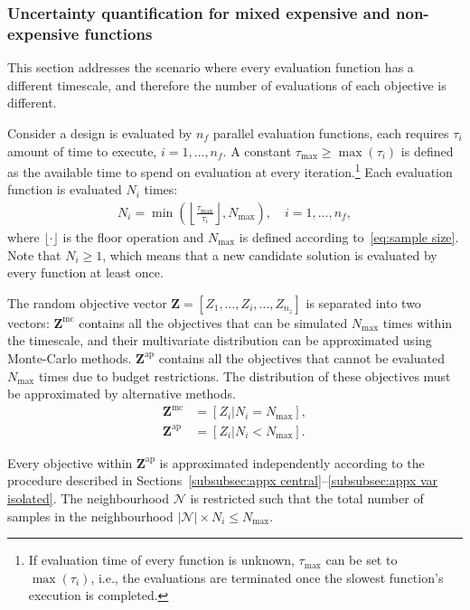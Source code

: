 \documentclass[a4paper]{article}
\newcommand{\brs}[1]{\left[{#1}\right]} %
\newcommand{\brr}[1]{{\left({#1}\right)}} %
\newcommand{\brabs}[1]{\left\vert{#1}\right\vert} %
\newcommand{\vZ}{\ensuremath{\mathbf{Z}}} %
\newcommand{\NSet}{\ensuremath{\mathcal{N}}} %
\begin{document}
\subsubsection{Uncertainty quantification for mixed expensive and non-expensive functions}
\label{subsubsec:mixed complexity functions}
This section addresses the scenario where every evaluation function has a different timescale, and therefore the number of evaluations of each objective is different.

Consider a design is evaluated by $n_f$ parallel evaluation functions, each requires $\tau_i$ amount of time to execute, $i=1,\ldots,n_f$. A constant $\tau_\text{max}\geq \max\brr{\tau_i}$ is defined as the available time to spend on evaluation at every iteration.\footnote{If evaluation time of every function is unknown, $\tau_\text{max}$ can be set to $\max\brr{\tau_i}$, i.e., the evaluations are terminated once the slowest function's execution is completed.} Each evaluation function is evaluated $N_i$ times:
\begin{align}
N_i = \min \brr{ \left\lfloor \frac{\tau_\text{max}}{\tau_i} \right\rfloor , N_\text{max}}, \quad i=1,\ldots,n_f,
\end{align}
where $\lfloor\cdot\rfloor$ is the floor operation and $N_\text{max}$ is defined according to~\eqref{eq:sample size}. Note that $N_i\geq 1$, which means that a new candidate solution is evaluated by every function at least once.

The random objective vector $\vZ=\brs{Z_1,\ldots,Z_i,\ldots,Z_{n_z}}$ is separated into two vectors: $\vZ^\text{mc}$ contains all the objectives that can be simulated $N_\text{max}$ times within the timescale, and their multivariate distribution can be approximated using Monte-Carlo methods. $\vZ^\text{ap}$ contains all the objectives that cannot be evaluated $N_\text{max}$ times due to budget restrictions. The distribution of these objectives must be approximated by alternative methods.
\begin{align}
\label{eq:Z monte carlo} \vZ^\text{mc} &= \brs{Z_i\vert N_i=N_\text{max}}, \\
\label{eq:Z approximate} \vZ^\text{ap} &= \brs{Z_i\vert N_i<N_\text{max}}.
\end{align}

Every objective within $\vZ^\text{ap}$ is approximated independently according to the procedure described in Sections~\ref{subsubsec:appx central}--\ref{subsubsec:appx var isolated}. The neighbourhood $\NSet$ is restricted such that the total number of samples in the neighbourhood $\brabs{\NSet}\times N_i\leq N_\text{max}$.
\end{document}
